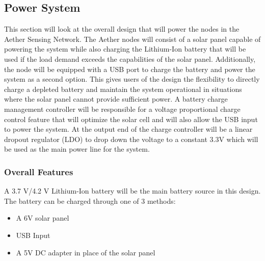 \subsection{Power System}
This section will look at the overall design that will power the nodes in the Aether Sensing Network. The Aether nodes will consist of a solar panel capable of powering the system while also charging the Lithium-Ion battery that will be used if the load demand exceeds the capabilities of the solar panel. Additionally, the node will be equipped with a USB port to charge the battery and power the system as a second option. This gives users of the design the flexibility to directly charge a depleted battery and maintain the system operational in situations where the solar panel cannot provide sufficient power. A battery charge management controller will be responsible for a voltage proportional charge control feature that will optimize the solar cell and will also allow the USB input to power the system. At the output end of the charge controller will be a linear dropout regulator (LDO) to drop down the voltage to a constant 3.3V which will be used as the main power line for the system.

\subsubsection{Overall Features}
A 3.7 V/4.2 V Lithium-Ion battery will be the main battery source in this design. The battery can be charged through one of 3 methods:
\begin{itemize}
    \item A 6V solar panel
    \item USB Input
    \item A 5V DC adapter in place of the solar panel
\end{itemize}

